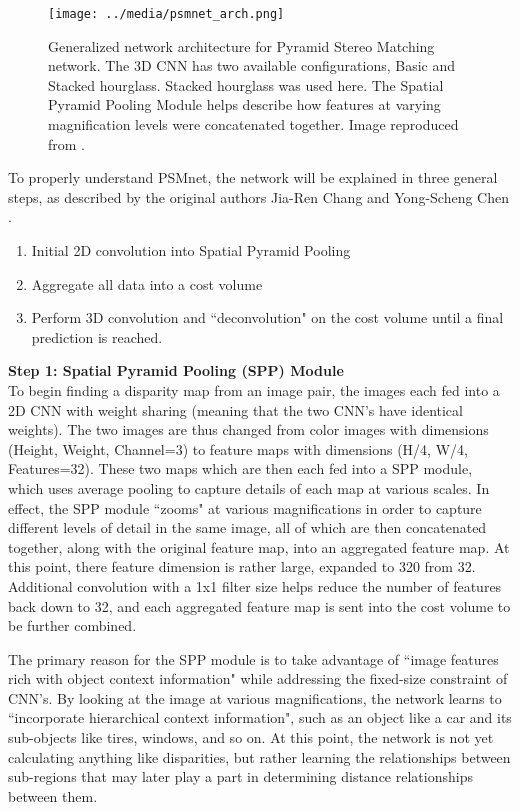 \begin{figure}[ht]
	\texttt{[image: ../media/psmnet\_arch.png]}
	\caption{Generalized network architecture for Pyramid Stereo Matching network. The 3D CNN has two available configurations, Basic and Stacked hourglass. Stacked hourglass was used here. The Spatial Pyramid Pooling Module helps describe how features at varying magnification levels were concatenated together. Image reproduced from \cite{chang_pyramid_2018}.}
	\label{psmnet_arch}
\end{figure}


To properly understand PSMnet, the network will be explained in three general steps, as described by the original authors Jia-Ren Chang and Yong-Scheng Chen \cite{chang_pyramid_2018}. 

\begin{enumerate}\itemsep=-0.5em
    \item Initial 2D convolution into Spatial Pyramid Pooling 
    \item Aggregate all data into a cost volume
    \item Perform 3D convolution and ``deconvolution" on the cost volume until a final prediction is reached.
\end{enumerate}

\textbf{{\large Step 1: Spatial Pyramid Pooling (SPP) Module}} \\
To begin finding a disparity map from an image pair, the images each fed into a 2D CNN with weight sharing (meaning that the two CNN's have identical weights). The two images are thus changed from
color images with dimensions (Height, Weight, Channel=3) to feature maps with dimensions (H/4, W/4, Features=32). These two maps which are then each fed into a SPP module, which uses average pooling to capture details of each map at various scales. In effect, the SPP module ``zooms" at various magnifications in order to capture different levels of detail in the same image, all of which are then concatenated together, along with the original feature map, into an aggregated feature map. At this point, there feature dimension is rather large, expanded to 320 from 32. Additional convolution with a 1x1 filter size helps reduce the number of features back down to 32, and each aggregated feature map is sent into the cost volume to be further combined.

The primary reason for the SPP module is to take advantage of ``image features rich with object context information" \cite{chang_pyramid_2018} while addressing the fixed-size constraint of CNN's. By looking at the image at various magnifications, the network learns to ``incorporate hierarchical context information", such as an object like a car and its sub-objects like tires, windows, and so on. At this point, the network is not yet calculating anything like disparities, but rather learning the relationships between sub-regions that may later play a part in determining distance relationships between them.


